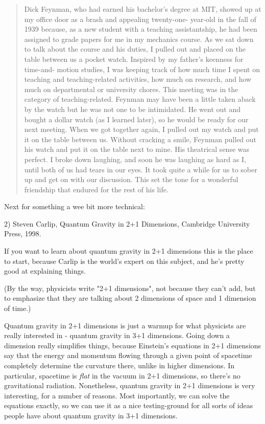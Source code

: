 \begin{quote}
     Dick Feynman, who had earned his bachelor's degree at MIT, 
     showed up at my office door as a brash and appealing twenty-one-
     year-old in the fall of 1939 because, as a new student with a
     teaching assistantship, he had been assigned to grade papers for
     me in my mechanics course.  As we sat down to talk about the course 
     and his duties, I pulled out and placed on the table between us
     a pocket watch.  Inspired by my father's keenness for time-and-
     motion studies, I was keeping track of how much time I spent on 
     teaching and teaching-related activities, how much on research, 
     and how much on departmental or university chores.  This meeting
     was in the category of teaching-related.  Feynman may have been 
     a little taken aback by the watch but he was not one to be 
     intimidated.  He went out and bought a dollar watch (as I learned
     later), so he would be ready for our next meeting.  When we got
     together again, I pulled out my watch and put it on the table 
     between us.  Without cracking a smile, Feynman pulled out his
     watch and put it on the table next to mine.  His theatrical sense
     was perfect.  I broke down laughing, and soon he was laughing as
     hard as I, until both of us had tears in our eyes.  It took quite
     a while for us to sober up and get on with our discussion.  This 
     set the tone for a wonderful friendship that endured for the rest
     of his life.
     
\end{quote}
    
Next for something a wee bit more technical:
    
2) Steven Carlip, Quantum Gravity in 2+1 Dimensions, Cambridge 
University Press, 1998.

If you want to learn about quantum gravity in 2+1 dimensions this is
the place to start, because Carlip is the world's expert on this subject, 
and he's pretty good at explaining things.  
 
(By the way, physicists write "2+1 dimensions", not because they can't
add, but to emphasize that they are talking about 2 dimensions of space
and 1 dimension of time.)
 
Quantum gravity in 2+1 dimensions is just a warmup for what physicists 
are really interested in - quantum gravity in 3+1 dimensions.   Going 
down a dimension really simplifies things, because Einstein's equations 
in 2+1 dimensions say that the energy and momentum flowing through a 
given point of spacetime completely determine the curvature there, 
unlike in higher dimensions.  In particular, spacetime is \emph{flat}
in the vacuum in 2+1 dimensions, so there's no gravitational radiation. 
Nonetheless, quantum gravity in 2+1 dimensions is very interesting, for
a number of reasons.  Most importantly, we can solve the equations
exactly, so we can use it as a nice testing-ground for all sorts of
ideas people have about quantum gravity in 3+1 dimensions.   

